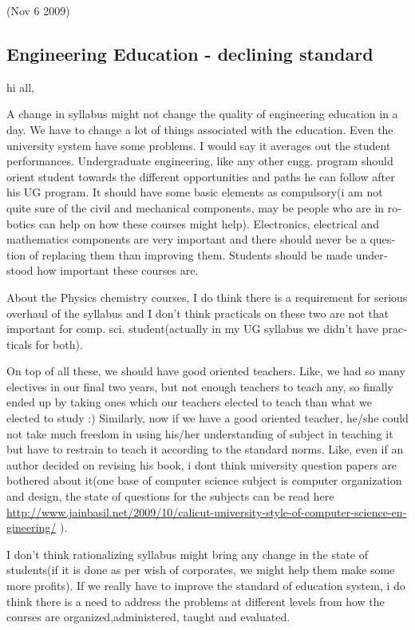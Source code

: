 \begin{english}
\begin{flushright}(Nov 6 2009)\end{flushright}

\subsection*{Engineering Education - declining standard}

hi all,

A change in syllabus might not change the quality of engineering education in a day. We have to change a lot of things associated with the education. Even the university system have some problems. I would say it averages out the student performances. Undergraduate engineering, like any other engg. program should orient student towards the different opportunities and paths he can follow after his UG program. It should have some basic elements as compulsory(i am not quite sure of the civil and mechanical components, may be people who are in robotics can help on how these courses might help). Electronics, electrical and mathematics components are very important and there should never be a question of replacing them than improving them. Students should be made understood how important these courses are.

About the Physics chemistry courses, I do think there is a requirement for serious overhaul of the syllabus and I don't think practicals on these two are not that important for comp. sci. student(actually in my UG syllabus we didn't have practicals for both).

On top of all these, we should have good oriented teachers. Like, we had so many electives in our final two years, but not enough teachers to teach any, so finally ended up by taking ones which our teachers elected to teach than what we elected to study :) Similarly, now if we have a good oriented teacher, he/she could not take much freedom in using his/her understanding of subject in teaching it but have to restrain to teach it according to the standard norms. Like, even if an author decided on revising his book, i dont think university question papers are bothered about it(one base of computer science subject is computer organization and design, the state of questions for the subjects can be read here \url{http://www.jainbasil.net/2009/10/calicut-university-style-of-computer-science-engineering/} ).

I don't think rationalizing syllabus might bring any change in the state of students(if it is done as per wish of corporates, we might help them make some more profits). If we really have to improve the standard of education system, i do think there is a need to address the problems at different levels from how the courses are organized,administered, taught and evaluated.


\end{english}
